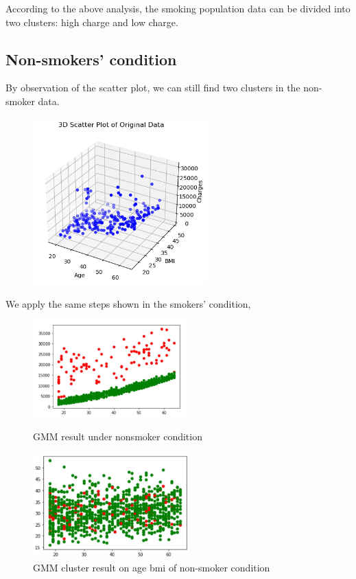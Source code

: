 \documentclass[12pt,a4paper]{article}
\begin{document}
According to the above analysis, the smoking population data can be divided into two clusters: high charge and low charge. 

\subsection{Non-smokers' condition}
By observation of the scatter plot, we can still find two clusters in the non-smoker data. 

\begin{figure}[H]
\centering
\includegraphics[width=0.6\textwidth]{non_smoker_scatter.png}
\end{figure}

We apply the same steps shown in the smokers' condition, 
\begin{figure}[H]
\centering
\begin{minipage}[t]{0.48\textwidth}
\centering
\includegraphics[width=6cm]{GMM RESULT with nonsmoker.jpg}
\caption{GMM result under nonsmoker condition}
\end{minipage}
\begin{minipage}[t]{0.48\textwidth}
\centering
\includegraphics[width=6cm]{SVM2.jpg}
\caption{GMM cluster result on age bmi of non-smoker condition}
\end{minipage}
\end{figure}
\end{document}
